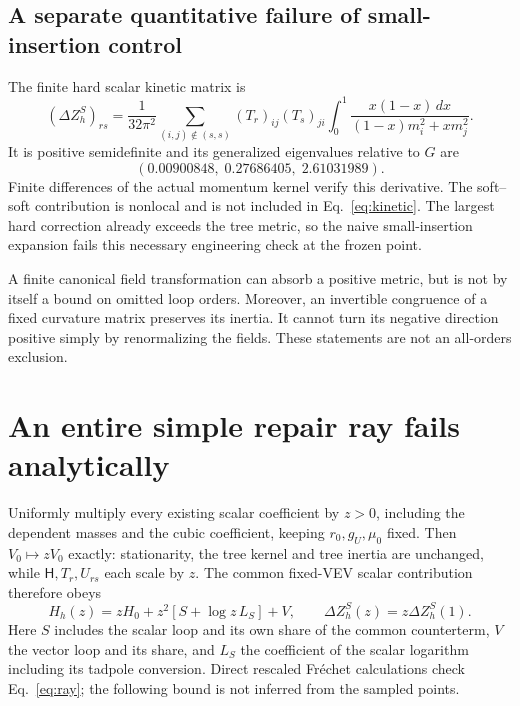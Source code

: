 \documentclass[11pt]{article}
\begin{document}
\subsection{A separate quantitative failure of small-insertion control}
The finite hard scalar kinetic matrix is
\begin{equation}
 (\Delta Z_h^S)_{rs}=\frac1{32\pi^2}
 \sum_{(i,j)\notin(s,s)}(T_r)_{ij}(T_s)_{ji}
 \int_0^1\frac{x(1-x)\,dx}{(1-x)m_i^2+x m_j^2}.
 \label{eq:kinetic}
\end{equation}
It is positive semidefinite and its generalized eigenvalues relative
to $G$ are
\begin{equation}
 (0.00900848,\;0.27686405,\;2.61031989).
\end{equation}
Finite differences of the actual momentum kernel verify this derivative.
The soft--soft contribution is nonlocal and is not included in
Eq.~\eqref{eq:kinetic}. The largest hard correction already exceeds
the tree metric, so the naive small-insertion expansion fails this
necessary engineering check at the frozen point.

A finite canonical field transformation can absorb a positive metric,
but is not by itself a bound on omitted loop orders. Moreover, an
invertible congruence of a fixed curvature matrix preserves its inertia.
It cannot turn its negative direction positive simply by renormalizing
the fields. These statements are not an all-orders exclusion.

\section{An entire simple repair ray fails analytically}
Uniformly multiply every existing scalar coefficient by $z>0$, including
the dependent masses and the cubic coefficient, keeping $r_0,g_U,\mu_0$
fixed. Then $V_0\mapsto zV_0$ exactly: stationarity, the tree kernel and
tree inertia are unchanged, while $\mathsf H,T_r,U_{rs}$ each scale by $z$.
The common fixed-VEV scalar contribution therefore obeys
\begin{equation}
 H_h(z)=zH_0+z^2[S+\log z\,L_S]+V,
 \qquad \Delta Z_h^S(z)=z\Delta Z_h^S(1).
 \label{eq:ray}
\end{equation}
Here $S$ includes the scalar loop and its own share of the common
counterterm, $V$ the vector loop and its share, and $L_S$ the coefficient
of the scalar logarithm including its tadpole conversion. Direct
rescaled Fr\'echet calculations check Eq.~\eqref{eq:ray}; the following
bound is not inferred from the sampled points.
\end{document}

